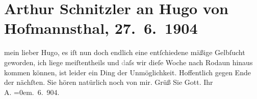 

         
         \renewcommand{\erwaehntePersonen}{Personen: Hugo von Hofmannsthal}
         \renewcommand{\erwaehnteOrte}{Orte: Rodaun, Wien}
         \renewcommand{\erwaehnteWerke}{}
               \section[Arthur Schnitzler an Hugo von Hofmannsthal, 27. 6. 1904]{ Arthur Schnitzler an Hugo von Hofmannsthal, 27. 6. 1904}\nopagebreak{}\rehead{ }\begin{ledgroupsized}[t]{13cm}\normalsize\beginnumbering{} \toendnotes[C]{\smallbreak\pagebreak[2]} 
\pstart
           \noindent{}{\pb}mein lieber Hugo, es iſt nun doch endlich eine entſchiedene mäßige
               Gelbſucht geworden, ich liege meiſtentheils und \textcolor{gray}{d}aſs wir dieſe
               Woche nach Rodaun hinaus kommen können, ist
               leider ein Ding der Unmöglichkeit. Hoffentlich gegen Ende der nächſten.\pend
           \pstart
           Sie hören natürlich noch {\pb}von mir. Grüß Sie Gott.\pend
           \pstart
           Ihr{\\[\baselineskip]}\spacefill\mbox{A.}\pend
           \leftskip=0em{}. 6. 904.\pend
           
         
         \endnumbering{}\end{ledgroupsized}  \newcommand{\dateiname}{L01410}\newcommand{\titel}{Arthur Schnitzler an Hugo von Hofmannsthal, 27. 6. 1904}\newcommand{\editorInnen}{Martin Anton Müller und Gerd-Hermann Susen}
      